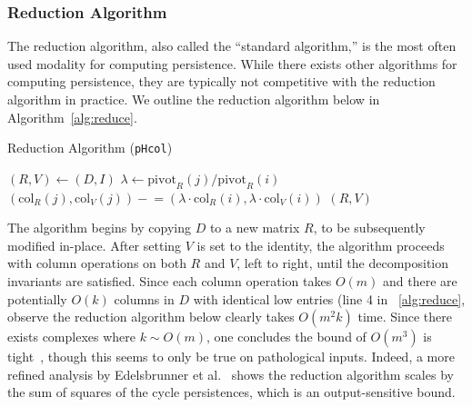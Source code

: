 \documentclass[sn-mathphys]{sn-jnl}
\begin{document}
\subsubsection{Reduction Algorithm}
The reduction algorithm, also called the ``standard algorithm,'' is the most often used modality  for computing persistence. While there exists other algorithms for computing persistence, they are typically not competitive with the reduction algorithm in practice. 
We outline the reduction algorithm below in Algorithm~\ref{alg:reduce}.
\begin{algorithm}[h!]
	\caption{Reduction Algorithm (\texttt{pHcol}) }
	\begin{algorithmic}[1]
		\State $(R, V) \gets (D, I)$
				\State $\lambda \gets \mathrm{pivot}_R(j)/\mathrm{pivot}_R(i)$
				\State $(\mathrm{col}_R(j), \mathrm{col}_V(j)) \mathrel{-}= \left ( \lambda \cdot \mathrm{col}_R(i), \lambda \cdot \mathrm{col}_V(i) \right )$
			\EndWhile
		\EndFor 
		\State \Return $(R, V)$
		\EndFunction
	\end{algorithmic}	\label{alg:reduce}
\end{algorithm}
The algorithm begins by copying $D$ to a new matrix $R$, to be subsequently modified in-place. After setting $V$ is set to the identity, the algorithm proceeds with column operations on both $R$ and $V$, left to right, until the decomposition invariants are satisfied. Since each column operation takes $O(m)$ and there are potentially $O(k)$ columns in $D$ with identical low entries (line 4 in ~\ref{alg:reduce}, observe the reduction algorithm below clearly takes $O(m^2 k)$ time. Since there exists complexes where $k \sim O(m)$, one concludes the bound of $O(m^3)$ is tight~\cite{morozov2005persistence}, though this seems to only be true on pathological inputs. Indeed, a more refined analysis by Edelsbrunner et al.~\cite{edelsbrunner2000topological} shows the reduction algorithm scales by the sum of squares of the cycle persistences, which is an output-sensitive bound. 
\end{document}
